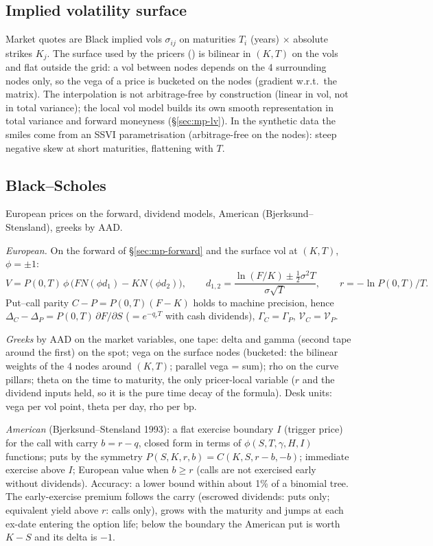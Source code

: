 \subsection{Implied volatility surface}\label{sec:mp-vol-surface}
Market quotes are Black implied vols $\sigma_{ij}$ on maturities $T_i$ (years) $\times$ absolute strikes $K_j$. The
surface used by the pricers () is bilinear in $(K, T)$ on the vols and flat
outside the grid: a vol between nodes depends on the 4 surrounding nodes only, so the vega of a price is bucketed
on the nodes (gradient w.r.t.\ the matrix). The interpolation is not arbitrage-free by construction (linear in vol,
not in total variance); the local vol model builds its own smooth representation in total variance and forward
moneyness (\S\ref{sec:mp-lv}). In the synthetic data the smiles come from an SSVI parametrisation (arbitrage-free on
the nodes): steep negative skew at short maturities, flattening with $T$.

\subsection{Black--Scholes}\label{sec:mp-bs}
European prices on the forward, dividend models, American (Bjerksund--Stensland), greeks by AAD.

\emph{European.} On the forward of \S\ref{sec:mp-forward} and the surface vol at $(K, T)$, $\phi = \pm 1$:
\[
  V = P(0,T)\,\phi\,\big(F N(\phi d_1) - K N(\phi d_2)\big),\qquad
  d_{1,2} = \frac{\ln(F/K) \pm \tfrac12 \sigma^2 T}{\sigma\sqrt T},\qquad r = -\ln P(0,T)/T.
\]
Put--call parity $C - P = P(0,T)(F - K)$ holds to machine precision, hence $\Delta_C - \Delta_P = P(0,T)\,\partial F/\partial S$
($= e^{-q_r T}$ with cash dividends), $\Gamma_C = \Gamma_P$, $\mathcal{V}_C = \mathcal{V}_P$.

\emph{Greeks} by AAD on the market variables, one tape: delta and gamma (second tape around the first) on the spot;
vega on the surface nodes (bucketed: the bilinear weights of the 4 nodes around $(K,T)$; parallel vega = sum); rho
on the curve pillars; theta on the time to maturity, the only pricer-local variable ($r$ and the dividend inputs held,
so it is the pure time decay of the formula). Desk units: vega per vol point, theta per day, rho per bp.

\emph{American} (Bjerksund--Stensland 1993): a flat exercise boundary $I$ (trigger price) for the call with carry
$b = r - q$, closed form in terms of $\phi(S, T, \gamma, H, I)$ functions; puts by the symmetry
$P(S, K, r, b) = C(K, S, r - b, -b)$; immediate exercise above $I$; European value when $b \ge r$ (calls are not
exercised early without dividends). Accuracy: a lower bound within about 1\% of a binomial tree. The early-exercise
premium follows the carry (escrowed dividends: puts only; equivalent yield above $r$: calls only), grows with the
maturity and jumps at each ex-date entering the option life; below the boundary the American put is worth $K - S$
and its delta is $-1$.

